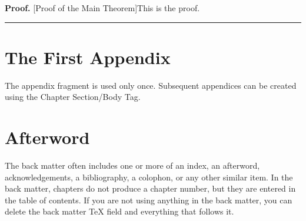 \documentclass{book}%
\newenvironment{proof}[1][Proof]{\noindent\textbf{#1.} }{\ \rule{0.5em}{0.5em}}
\begin{document}
\begin{proof}
[Proof of the Main Theorem]This is the proof.
\end{proof}

\appendix


\chapter{The First Appendix}

The appendix fragment is used only once. Subsequent appendices can be created
using the Chapter Section/Body Tag.

\backmatter


\chapter{Afterword}

The back matter often includes one or more of an index, an afterword,
acknowledgements, a bibliography, a colophon, or any other similar item. In
the back matter, chapters do not produce a chapter number, but they are
entered in the table of contents. If you are not using anything in the back
matter, you can delete the back matter
\TeX{}
field and everything that follows it.
\end{document}
